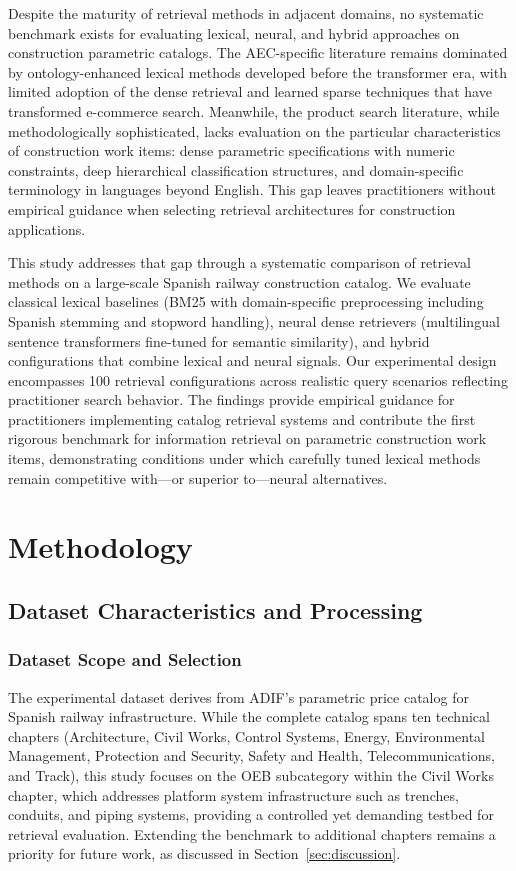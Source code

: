 \documentclass[preprint,12pt]{elsarticle}
\begin{document}
Despite the maturity of retrieval methods in adjacent domains, no systematic benchmark exists for evaluating lexical, neural, and hybrid approaches on construction parametric catalogs. The AEC-specific literature remains dominated by ontology-enhanced lexical methods developed before the transformer era, with limited adoption of the dense retrieval and learned sparse techniques that have transformed e-commerce search. Meanwhile, the product search literature, while methodologically sophisticated, lacks evaluation on the particular characteristics of construction work items: dense parametric specifications with numeric constraints, deep hierarchical classification structures, and domain-specific terminology in languages beyond English. This gap leaves practitioners without empirical guidance when selecting retrieval architectures for construction applications.

This study addresses that gap through a systematic comparison of retrieval methods on a large-scale Spanish railway construction catalog. We evaluate classical lexical baselines (BM25 with domain-specific preprocessing including Spanish stemming and stopword handling), neural dense retrievers (multilingual sentence transformers fine-tuned for semantic similarity), and hybrid configurations that combine lexical and neural signals. Our experimental design encompasses 100 retrieval configurations across realistic query scenarios reflecting practitioner search behavior. The findings provide empirical guidance for practitioners implementing catalog retrieval systems and contribute the first rigorous benchmark for information retrieval on parametric construction work items, demonstrating conditions under which carefully tuned lexical methods remain competitive with—or superior to—neural alternatives.

\section{Methodology}

\subsection{Dataset Characteristics and Processing}

\subsubsection{Dataset Scope and Selection}

The experimental dataset derives from ADIF's parametric price catalog for Spanish railway infrastructure. While the complete catalog spans ten technical chapters (Architecture, Civil Works, Control Systems, Energy, Environmental Management, Protection and Security, Safety and Health, Telecommunications, and Track), this study focuses on the OEB subcategory within the Civil Works chapter, which addresses platform system infrastructure such as trenches, conduits, and piping systems, providing a controlled yet demanding testbed for retrieval evaluation. Extending the benchmark to additional chapters remains a priority for future work, as discussed in Section~\ref{sec:discussion}.
\end{document}
